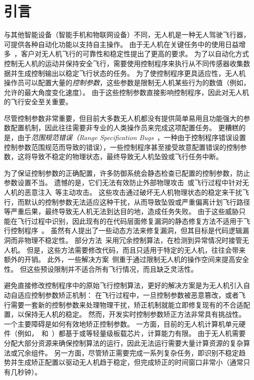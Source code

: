 \section{引言}
与其他智能设备（智能手机和物联网设备）不同，无人机是一种无人驾驶飞行器，可提供各种自动化功能以支持自主操作。
由于无人机在关键任务中的使用日益增多~\cite{hassija2021fast, sharma2020communication}，客户对无人机飞行的可靠性和稳定性提出了更高的要求。
为了以自动化方式控制无人机的运动并保持安全飞行，需要使用控制程序来执行从不同传感器收集数据并生成控制输出以稳定飞行状态的任务。
为了使控制程序更具适应性，无人机操作员可以配置大量的\emph{控制参数}，这些参数是限制无人机某些行为的数值（例如，允许的最大角度变化速度）。
由于这些控制参数直接影响控制程序，因此对无人机的飞行安全至关重要。

尽管控制参数非常重要，但目前大多数无人机都没有提供简单易用且功能强大的参数配置机制，因此往往需要非专业的人类操作员来完成这项配置任务。
更糟糕的是，由于\emph{范围规范错误（Range Specification Bugs}~\cite{rvfuzzer,han2022control}，一种由于控制程序错误设置控制参数范围规范而导致的错误），一些控制程序甚至接受故意配置错误的控制参数，这将导致不稳定的物理状态，最终导致无人机坠毁或飞行任务中断。

为了保证控制参数的正确配置，许多防御系统会静态检查已配置的控制参数，防止参数设置不当。
遗憾的是，它们无法有效防止外部物理攻击~\cite{choi2018detecting, quinonez2020savior, dash2019out, tippenhauer2011requirements, son2015rocking, fadilahBLC20, trippel2017walnut}或飞行过程中针对无人机的恶意注入~\cite{rvfuzzer, han2022control, zhou2022doublestar}等主动攻击。
这些攻击通过破坏无人机物理状态的稳定来干扰飞行，而默认的控制参数无法适应这种干扰，从而导致坠毁或严重偏离计划飞行路径等严重后果，最终导致无人机无法到达目的地，造成任务失败。
由于这些威胁只能在飞行过程中识别，因此现有的在代码层面修复漏洞的静态修复方法不适用于飞行控制程序~\cite{kim2022pgpatch, mayday, qi2014strength, kim2022reverse}。
虽然有人提出了一些动态方法来修复漏洞，但其目标是代码逻辑漏洞而非物理不稳定性。
部分方法~\cite{choi2020software, dash2021pid}采用冗余控制算法，在检测到异常情况时接管无人机。
但是，这些方法需要修改代码，而且只适用于特定的无人机，往往会带来额外的开销。
此外，一些解决方案~\cite{rvfuzzer, han2022control}侧重于通过限制无人机的操作空间来提高安全性。
但这些预设限制并不适合所有飞行情况，而且缺乏灵活性。

避免直接修改控制程序中的原始飞行控制算法，更好的解决方案是为无人机引入自动自适应控制参数矫正机制：
在飞行过程中，一旦控制参数被恶意篡改，或者飞行需要一套新的控制参数来处理物理干扰，矫正机制就能立即修复现有的不合适配置，以保持无人机的稳定。
然而，开发实时控制参数矫正方法非常具有挑战性。
一个主要障碍是如何有效地矫正控制参数。
一方面，目前的无人机计算机单元硬件（例如，~\cite{meier2011pixhawk}和~\cite{ebeid2018survey}）都基于或等轻量级板载芯片，计算能力有限。
由于无人机需要分配大部分资源来确保控制算法的运行，因此无法运行需要大量计算资源的复杂算法或冗余组件。
另一方面，尽管矫正需要完成一系列复杂任务，即识别不稳定趋势并生成矫正配置以驱动无人机趋于稳定，但完成矫正的时间窗口非常小（通常只有几秒钟）。


